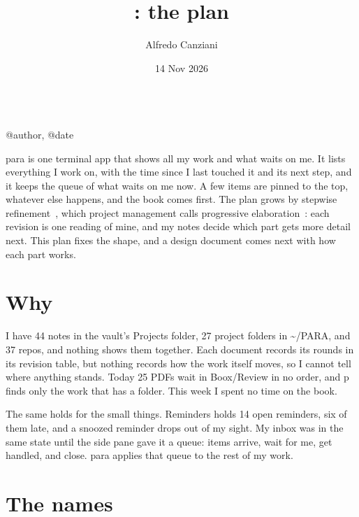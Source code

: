 \documentclass[11pt,a4paper]{article}
\title{\n{para}: the plan}
\author{Alfredo Canziani}
\date{14 Nov 2026}
\newcommand{\n}[1]{\textsf{#1}}
\newcommand{\home}{\textasciitilde}
\begin{document}
\\[1mm]
\csname @author\endcsname, \csname @date\endcsname\par\medskip

\noindent \n{para} is one terminal app that shows all my work and what waits on me. It lists everything I work on, with the time since I last touched it and its next step, and it keeps the queue of what waits on me now. A few items are pinned to the top, whatever else happens, and the book comes first. %
The plan grows by stepwise refinement~\cite{wirth}, which project management calls progressive elaboration~\cite{pmbok}: each revision is one reading of mine, and my notes decide which part gets more detail next. This plan fixes the shape, and a design document comes next with how each part works.

\section{Why}

I have 44 notes in the vault's \n{Projects} folder, 27 project folders in \n{\home/PARA}, and 37 repos, and nothing shows them together. Each document records its rounds in its revision table, but nothing records how the work itself moves, so I cannot tell where anything stands. Today 25 PDFs wait in \n{Boox/Review} in no order, and \n{p} finds only the work that has a folder. This week I spent no time on the book.

The same holds for the small things. \n{Reminders} holds 14 open reminders, six of them late, and a snoozed reminder drops out of my sight.
 My inbox was in the same state until the side pane gave it a queue: items arrive, wait for me, get handled, and close. \n{para} applies that queue to the rest of my work.

\section{The names}
\end{document}
